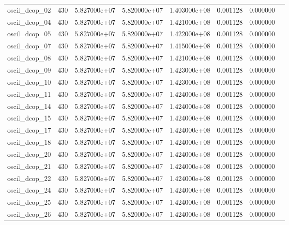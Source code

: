 \begin{tabular}{llrrrrrr}
oscil\_dcop\_02           &  430 &  5.827000e+07 &  5.820000e+07 &  1.403000e+08 &  0.001128 &  0.000000 \\
oscil\_dcop\_04           &  430 &  5.827000e+07 &  5.820000e+07 &  1.421000e+08 &  0.001128 &  0.000000 \\
oscil\_dcop\_05           &  430 &  5.827000e+07 &  5.820000e+07 &  1.422000e+08 &  0.001128 &  0.000000 \\
oscil\_dcop\_07           &  430 &  5.827000e+07 &  5.820000e+07 &  1.415000e+08 &  0.001128 &  0.000000 \\
oscil\_dcop\_08           &  430 &  5.827000e+07 &  5.820000e+07 &  1.421000e+08 &  0.001128 &  0.000000 \\
oscil\_dcop\_09           &  430 &  5.827000e+07 &  5.820000e+07 &  1.423000e+08 &  0.001128 &  0.000000 \\
oscil\_dcop\_10           &  430 &  5.827000e+07 &  5.820000e+07 &  1.423000e+08 &  0.001128 &  0.000000 \\
oscil\_dcop\_11           &  430 &  5.827000e+07 &  5.820000e+07 &  1.424000e+08 &  0.001128 &  0.000000 \\
oscil\_dcop\_14           &  430 &  5.827000e+07 &  5.820000e+07 &  1.424000e+08 &  0.001128 &  0.000000 \\
oscil\_dcop\_15           &  430 &  5.827000e+07 &  5.820000e+07 &  1.424000e+08 &  0.001128 &  0.000000 \\
oscil\_dcop\_17           &  430 &  5.827000e+07 &  5.820000e+07 &  1.424000e+08 &  0.001128 &  0.000000 \\
oscil\_dcop\_18           &  430 &  5.827000e+07 &  5.820000e+07 &  1.424000e+08 &  0.001128 &  0.000000 \\
oscil\_dcop\_20           &  430 &  5.827000e+07 &  5.820000e+07 &  1.424000e+08 &  0.001128 &  0.000000 \\
oscil\_dcop\_21           &  430 &  5.827000e+07 &  5.820000e+07 &  1.424000e+08 &  0.001128 &  0.000000 \\
oscil\_dcop\_22           &  430 &  5.827000e+07 &  5.820000e+07 &  1.424000e+08 &  0.001128 &  0.000000 \\
oscil\_dcop\_24           &  430 &  5.827000e+07 &  5.820000e+07 &  1.424000e+08 &  0.001128 &  0.000000 \\
oscil\_dcop\_25           &  430 &  5.827000e+07 &  5.820000e+07 &  1.424000e+08 &  0.001128 &  0.000000 \\
oscil\_dcop\_26           &  430 &  5.827000e+07 &  5.820000e+07 &  1.424000e+08 &  0.001128 &  0.000000 \\

\end{tabular}
